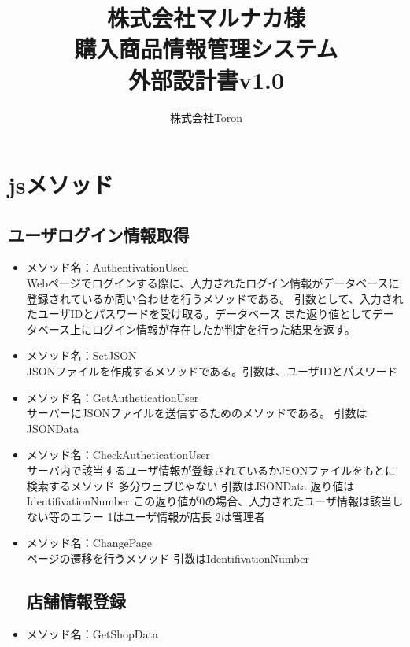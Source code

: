\documentclass[a4j]{jarticle}
\title{
\vspace{30mm}
株式会社マルナカ様\\
購入商品情報管理システム\\
外部設計書v1.0
\vspace{90mm}
}
\author{
株式会社Toron
}
\begin{document}
\maketitle
\newpage
\tableofcontents
\newpage
\section{jsメソッド}
\subsection{ユーザログイン情報取得}
\begin{itemize}
\item メソッド名：AuthentivationUsed\\
Webページでログインする際に、入力されたログイン情報がデータベースに登録されているか問い合わせを行うメソッドである。
引数として、入力されたユーザIDとパスワードを受け取る。データベース
また返り値としてデータベース上にログイン情報が存在したか判定を行った結果を返す。

\item メソッド名：SetJSON\\

JSONファイルを作成するメソッドである。引数は、ユーザIDとパスワード

\item メソッド名：GetAutheticationUser\\

サーバーにJSONファイルを送信するためのメソッドである。
引数はJSONData

\item メソッド名：CheckAutheticationUser\\

サーバ内で該当するユーザ情報が登録されているかJSONファイルをもとに検索するメソッド
多分ウェブじゃない
引数はJSONData
返り値はIdentifivationNumber
この返り値が0の場合、入力されたユーザ情報は該当しない等のエラー
1はユーザ情報が店長
2は管理者

\item メソッド名：ChangePage\\

ページの遷移を行うメソッド
引数はIdentifivationNumber

\subsection{店舗情報登録}
%
\item メソッド名：GetShopData\\


\end{itemize}
\end{document}
